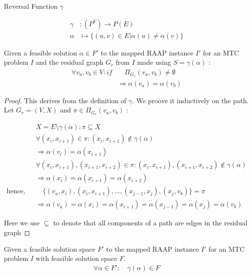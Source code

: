 \documentclass{article}
\begin{document}
\begin{definition}
Reversal Function $\gamma$

\begin{align}
	\nonumber \gamma & : (P^V) \rightarrow P(E) \\
	\nonumber \alpha & \mapsto \{(u,v) \in E | \alpha(u) \neq \alpha(v)\}
\end{align}
\end{definition}

\begin{lemma}
\label{PATHASSIGN}
Given a feasible solution $\alpha \in F'$ to the mapped RAAP instance $I'$ for an MTC problem $I$ and the residual graph $G_r$ from $I$ made using $S = \gamma(\alpha)$ :
\begin{align}
	\nonumber \forall v_a, v_b \in V : if & \quad \Pi_{G_r}(v_a, v_b) \neq \emptyset \\
	\nonumber & \Rightarrow \alpha(v_a) = \alpha(v_b)
\end{align}
\end{lemma}

\begin{proof}
This derives from the definition of $\gamma$.
We proove it inductively on the path.
Let $G_r = (V, X)$ and $\pi \in \Pi_{G_r}(v_a, v_b)$ :

\begin{align}
	\nonumber & X = E \setminus \gamma(\alpha) : \pi \subseteq X \\
	\nonumber & \forall (x_i, x_{i+1}) \in \pi : (x_i, x_{i+1}) \not\in \gamma(\alpha) \\
	\nonumber & \Rightarrow \alpha(v_i) = \alpha(x_{i+1}) \\
	\nonumber & \forall (x_i, x_{i+1}), (x_{i+1}, x_{i+2}) \in \pi : (x_i, x_{i+1}), (x_{i+1}, x_{i+2}) \not\in \gamma(\alpha) \\
	\nonumber & \Rightarrow \alpha(x_i) = \alpha(x_{i+1}) = \alpha(x_{i+2}) \\
	\nonumber \mbox{hence, let} & \quad \{(v_a, x_i), (x_i, x_{i+1}),...,(x_{j-1}, x_j), (x_j, v_b)\} = \pi \\
	\nonumber & \Rightarrow \alpha(v_a) = \alpha(x_i) = \alpha(x_{i+1}) = \alpha(x_{j-1}) = \alpha(x_j) = \alpha(v_b)
\end{align}

Here we use $\subseteq$ to denote that all components of a path are edges in the residual graph

\end{proof}

\begin{lemma}
Given a feasible solution space $F'$ to the mapped RAAP instance $I'$ for an MTC problem $I$ with feasible solution space $F$.
\begin{align}
	\nonumber \forall \alpha \in F' : \quad \gamma(\alpha) \in F
\end{align}
\end{lemma}
\end{document}
